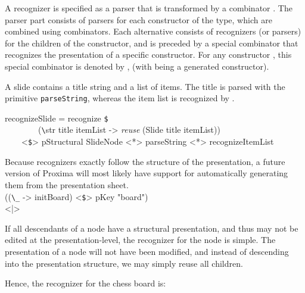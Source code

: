 


A recognizer is specified as a parser that is transformed by a combinator . The parser part consists of parsers for each constructor of the type, which are combined using \p{<|>} combinators. Each alternative consists of recognizers (or parsers) for the children of the constructor, and is preceded by a special combinator that recognizes the presentation of a specific constructor. For any constructor , this special combinator is denoted by , (with  being a generated constructor).

A slide contains a title string and a list of items.  The title is parsed with the primitive \verb|parseString|, whereas the item list is recognized by .

\ttfamily\begin{small}\begin{tabbing}
recognizeSlide = recognize \verb|$|\\
~~~~~~~~(\verb|\|str title itemList -> {\em reuse} (Slide title itemList))\\
~~~~<\verb|$|> pStructural SlideNode <*> parseString <*> recognizeItemList
\end{tabbing}\end{small}\rmfamily

Because recognizers exactly follow the structure of the presentation, a future version of Proxima will most likely have support for automatically generating them from the presentation sheet. 
\bc \\
      ((\verb|\_| -> initBoard) <\verb|$|> pKey "board")\\
  <|>    \ec
  

If all descendants of a node have a structural presentation, and thus may not be edited at the presentation-level, the recognizer for the node is simple. The presentation of a node will not have been modified, and instead of descending into the presentation structure, we may simply reuse all children.

Hence, the recognizer for the chess board is:

